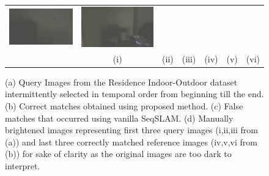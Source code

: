 \documentclass[letterpaper, 10 pt, conference]{ieeeconf}  %
\begin{document}
\begin{figure}
\begin{tabular*}{\textwidth}{ccccccc}
 \includegraphics[width=\imgW,height=\imgH]{rio-r6-2} &
 \includegraphics[width=\imgW,height=\imgH]{rio-r8-2} \\
 
 & (i) & (ii) & (iii) & (iv) & (v) & (vi) \\


\end{tabular*}
\caption{(a) Query Images from the Residence Indoor-Outdoor dataset intermittently selected in temporal order from beginning till the end. (b) Correct matches obtained using proposed method. (c) False matches that occurred using vanilla SeqSLAM. (d) Manually brightened images representing first three query images (i,ii,iii from (a)) and last three correctly matched reference images (iv,v,vi from (b)) for sake of clarity as the original images are too dark to interpret.}
\label{fig:rioTransImages}
\end{figure}
\end{document}
